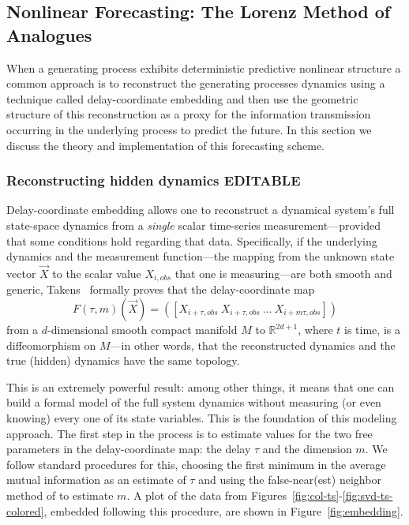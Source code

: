 \subsection{Nonlinear Forecasting: The Lorenz Method of Analogues}
\label{sec:lma}

When a generating process exhibits deterministic predictive nonlinear
structure a common approach is to reconstruct the generating processes
dynamics using a technique called delay-coordinate embedding and then
use the geometric structure of this reconstruction as a proxy for the
information transmission occurring in the underlying process to
predict the future. In this section we discuss the theory and
implementation of this forecasting scheme.


 \subsubsection{Reconstructing hidden dynamics {\color{blue} EDITABLE}}



Delay-coordinate embedding allows one to reconstruct a dynamical system's full
state-space dynamics from a \emph{single} scalar time-series
measurement---provided that some conditions hold regarding that data.
Specifically, if the underlying dynamics and the measurement
function---the mapping from the unknown state vector $\vec{X}$ to the
scalar value $X_{i,obs}$ that one is measuring---are both smooth and generic,
Takens~\cite{takens} formally proves that the delay-coordinate map
\[
F(\tau,m)(\vec{X}) = ([X_{i+\tau,obs} ~ X_{i+\tau,obs} ~ \dots ~X_{i+m\tau,obs}])
\]
from a $d$-dimensional smooth compact manifold $M$ to $\mathbb{R}^{2d+1}$,
where $t$ is time, is a diffeomorphism on $M$---in other words, that
the reconstructed dynamics and the true (hidden) dynamics have the
same topology.

This is an extremely powerful result: among other things, it means
that one can build a formal model of the full system dynamics without
measuring (or even knowing) every one of its state variables.  This is
the foundation of this modeling approach.
The first step in the process is to estimate values for the two free
parameters in the delay-coordinate map: the delay $\tau$ and the
dimension $m$.  We follow standard procedures for this, choosing the
first minimum in the average mutual information as an estimate of
$\tau$ \cite{fraser-swinney} and using the false-near(est) neighbor
method of \cite{KBA92} to estimate $m$.  A
plot of the data from Figures~\ref{fig:col-ts}-\ref{fig:svd-ts-colored}, embedded following this
procedure, are shown in Figure~\ref{fig:embedding}.



